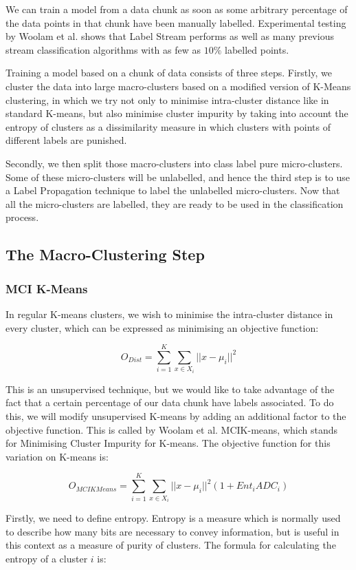 \documentclass[12pt,a4paper,oneside]{report}
\begin{document}
We can train a model from a data chunk as soon as some arbitrary percentage of the data points in that chunk have been manually labelled. Experimental testing by Woolam et al. shows that Label Stream performs as well as many previous stream classification algorithms with as few as \(10\%\) labelled points.\cite{LabStr}

Training a model based on a chunk of data consists of three steps. Firstly, we cluster the data into large macro-clusters based on a modified version of K-Means clustering, in which we try not only to minimise intra-cluster distance like in standard K-means, but also minimise cluster impurity by taking into account the entropy of clusters as a dissimilarity measure in which clusters with points of different labels are punished. 

Secondly, we then split those macro-clusters into class label pure micro-clusters. Some of these micro-clusters will be unlabelled, and hence the third step is to use a Label Propagation technique to label the unlabelled micro-clusters. Now that all the micro-clusters are labelled, they are ready to be used in the classification process. 

\subsection{The Macro-Clustering Step}

\subsubsection{MCI K-Means}
 In regular K-means clusters, we wish to minimise the intra-cluster distance in every cluster, which can be expressed  as minimising an objective function: 
 
 \[ O_{Dist} = \sum_{i=1}^K \sum_{x\in X_i}|| x - \mu_i||^2 \]
 
This is an unsupervised technique, but we would like to take advantage of the fact that a certain percentage of our data chunk have labels associated. To do this, we will modify unsupervised K-means by adding an additional factor to the objective function. This is called by Woolam et al. MCIK-means, which stands for Minimising Cluster Impurity for K-means. \cite{LabStr} The objective function for this variation on K-means is:
 
 \[ O_{MCIKMeans} = \sum_{i=1}^K \sum_{x\in X_i}|| x - \mu_i||^2(1 + Ent_iADC_i)\]
  
Firstly, we need to define entropy. Entropy is a measure which is normally used to describe how many bits are necessary to convey information, but is useful in this context as a measure of purity of clusters. The formula for calculating the entropy of a cluster \(i\) is:
 
\end{document}
